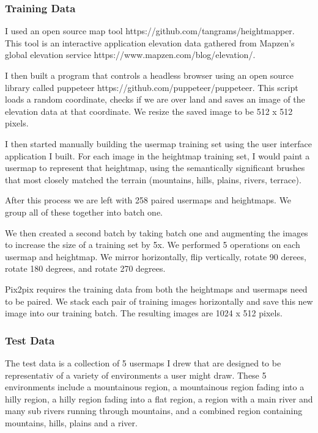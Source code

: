 \documentclass[twocolumn]{article}
\begin{document}
	\subsubsection{Training Data}
	
	I used an open source map tool https://github.com/tangrams/heightmapper. This tool is an interactive application elevation data gathered from Mapzen's global elevation service https://www.mapzen.com/blog/elevation/.
	
	I then built a program that controls a headless browser using an open source library called puppeteer https://github.com/puppeteer/puppeteer. This script loads a random coordinate, checks if we are over land and saves an image of the elevation data at that coordinate. We resize the saved image to be 512 x 512 pixels.
	
	I then started manually building the usermap training set using the user interface application I built. For each image in the heightmap training set, I would paint a usermap to represent that heightmap, using the semantically significant brushes that most closely matched the terrain (mountains, hills, plains, rivers, terrace).

	After this process we are left with 258 paired usermaps and heightmaps. We group all of these together into batch one.
	
	We then created a second batch by taking batch one and augmenting the images to increase the size of a training set by 5x. We performed 5 operations on each usermap and heightmap. We mirror horizontally, flip vertically, rotate 90 derees, rotate 180 degrees, and rotate 270 degrees.	
	
	Pix2pix requires the training data from both the heightmaps and usermaps need to be paired. We stack each pair of training images horizontally and save this new image into our training batch. The resulting images are 1024 x 512 pixels.
		
		
	\subsubsection{Test Data}
	
	The test data is a collection of 5 usermaps I drew that are designed to be representativ of a variety of environments a user might draw. These 5 environments include a mountainous region, a mountainous region fading into a hilly region, a hilly region fading into a flat region, a region with a main river and many sub rivers running through mountains, and a combined region containing mountains, hills, plains and a river.
	
\end{document}
